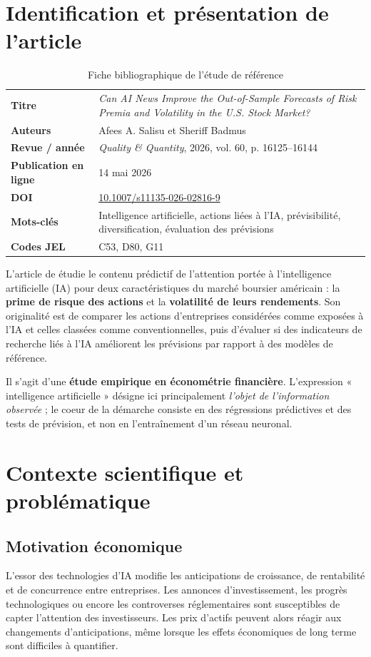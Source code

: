 \documentclass[11pt,a4paper]{article}
\begin{document}
\section{Identification et présentation de l'article}
\begin{table}[H]
\centering\small
\caption{Fiche bibliographique de l'étude de référence}
\begin{tabularx}{\textwidth}{@{}>{\bfseries}p{3.15cm}X@{}}
\toprule
Titre & \textit{Can AI News Improve the Out-of-Sample Forecasts of Risk Premia and Volatility in the U.S. Stock Market?}\\
Auteurs & Afees A. Salisu et Sheriff Badmus\\
Revue / année & \textit{Quality \& Quantity}, 2026, vol. 60, p. 16125--16144\\
Publication en ligne & 14 mai 2026\\
DOI & \href{https://doi.org/10.1007/s11135-026-02816-9}{10.1007/s11135-026-02816-9}\\
Mots-clés & Intelligence artificielle, actions liées à l'IA, prévisibilité, diversification, évaluation des prévisions\\
Codes JEL & C53, D80, G11\\
\bottomrule
\end{tabularx}
\end{table}

L'article de \cite{SalisuBadmus2026} étudie le contenu prédictif de l'attention portée à l'intelligence artificielle (IA) pour deux caractéristiques du marché boursier américain : la \textbf{prime de risque des actions} et la \textbf{volatilité de leurs rendements}. Son originalité est de comparer les actions d'entreprises considérées comme exposées à l'IA et celles classées comme conventionnelles, puis d'évaluer si des indicateurs de recherche liés à l'IA améliorent les prévisions par rapport à des modèles de référence.

Il s'agit d'une \textbf{étude empirique en économétrie financière}. L'expression « intelligence artificielle » désigne ici principalement \emph{l'objet de l'information observée} ; le coeur de la démarche consiste en des régressions prédictives et des tests de prévision, et non en l'entraînement d'un réseau neuronal.

\section{Contexte scientifique et problématique}
\subsection{Motivation économique}
L'essor des technologies d'IA modifie les anticipations de croissance, de rentabilité et de concurrence entre entreprises. Les annonces d'investissement, les progrès technologiques ou encore les controverses réglementaires sont susceptibles de capter l'attention des investisseurs. Les prix d'actifs peuvent alors réagir aux changements d'anticipations, même lorsque les effets économiques de long terme sont difficiles à quantifier.
\end{document}
